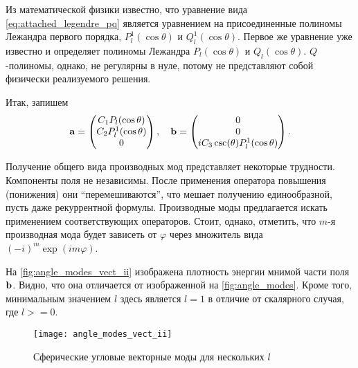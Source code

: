\documentclass[12pt,a4paper]{article}
\begin{document}
            Из математической физики известно, что уравнение вида \autoref{eq:attached_legendre_pq} является уравнением на присоединенные полиномы Лежандра первого порядка, $P_l^1(\cos\theta)$ и $Q_l^1(\cos\theta)$. Первое же уравнение уже известно и определяет полиномы Лежандра $P_l(\cos\theta)$ и $Q_l(\cos\theta)$. $Q$-полиномы, однако, не регулярны в нуле, потому не представляют собой физически реализуемого решения.

            Итак, запишем
            \begin{equation}
                \vb{a} = \begin{pmatrix}
                    C_1 P_l(\cos\theta) \\
                    C_2 P_l^1(\cos\theta) \\
                    0
                \end{pmatrix} , \quad
                \vb{b} = \begin{pmatrix}
                    0 \\
                    0 \\
                    i C_3 \csc(\theta) P_l^1(\cos\theta)
                \end{pmatrix} .
            \end{equation}

            Получение общего вида производных мод представляет некоторые трудности. Компоненты поля не независимы. После применения оператора повышения (понижения) они \enquote{перемешиваются}, что мешает получению единообразной, пусть даже рекуррентной формулы. Производные моды предлагается искать применением соответствующих операторов. Стоит, однако, отметить, что $m$-я производная мода будет зависеть от $\varphi$ через множитель вида $(-i)^m \exp(i m \varphi)$.

            На \autoref{fig:angle_modes_vect_ii} изображена плотность энергии мнимой части поля $\vb{b}$. Видно, что она отличается от изображенной на \autoref{fig:angle_modes}. Кроме того, минимальным значением $l$ здесь является $l = 1$ в отличие от скалярного случая, где $l >= 0$.
            \begin{figure}[h]
                \centering
                \texttt{[image: angle\_modes\_vect\_ii]}
                \caption[]{Сферические угловые векторные моды для нескольких $l$}
                \label{fig:angle_modes_vect_ii}
            \end{figure}

\end{document}
